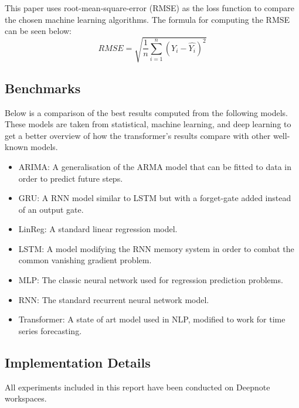 This paper uses root-mean-square-error (RMSE) as the loss function to compare the chosen machine learning algorithms. The formula for computing the RMSE can be seen below: 
$$RMSE = \sqrt{\frac 1 n \displaystyle\sum_{i=1}^n(Y_i - \hat{Y_i})^2}$$

\subsection{Benchmarks}
Below is a comparison of the best results computed from the following models. These models are taken from statistical, machine learning, and deep learning to get a better overview of how the transformer's results compare with other well-known models.
\begin{itemize}
    \item ARIMA: A generalisation of the ARMA model that can be fitted to data in order to predict future steps.
    \item GRU: A RNN model similar to LSTM but with a forget-gate added instead of an output gate.
    \item LinReg: A standard linear regression model.
    \item LSTM: A model modifying the RNN memory system in order to combat the common vanishing gradient problem.
    \item MLP: The classic neural network used for regression prediction problems.
    \item RNN: The standard recurrent neural network model.
    \item Transformer: A state of art model used in NLP, modified to work for time series forecasting.
\end{itemize}

\subsection{Implementation Details}
All experiments included in this report have been conducted on Deepnote workspaces\cite{deepnote}.


